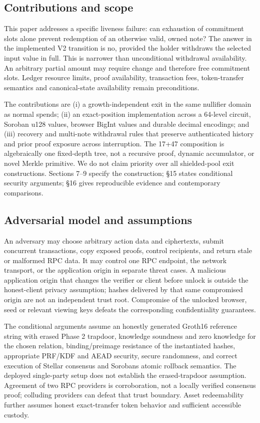 \documentclass[11pt,letterpaper]{article}
\begin{document}
\subsection{Contributions and scope}\label{contributions-and-scope}

This paper addresses a specific liveness failure: can exhaustion of
commitment slots alone prevent redemption of an otherwise valid, owned
note? The answer in the implemented V2 transition is no, provided the
holder withdraws the selected input value in full. This is narrower than
unconditional withdrawal availability. An arbitrary partial amount may
require change and therefore free commitment slots. Ledger resource
limits, proof availability, transaction fees, token-transfer semantics
and canonical-state availability remain preconditions.

The contributions are (i) a growth-independent exit in the same
nullifier domain as normal spends; (ii) an exact-position implementation
across a 64-level circuit, Soroban u128 values, browser BigInt values
and durable decimal encodings; and (iii) recovery and multi-note
withdrawal rules that preserve authenticated history and prior proof
exposure across interruption. The 17+47 composition is algebraically one
fixed-depth tree, not a recursive proof, dynamic accumulator, or novel
Merkle primitive. We do not claim priority over all shielded-pool exit
constructions. Sections 7--9 specify the construction; \S{}15 states
conditional security arguments; \S{}16 gives reproducible evidence and
contemporary comparisons.

\subsection{Adversarial model and
assumptions}\label{adversarial-model-and-assumptions}

An adversary may choose arbitrary action data and ciphertexts, submit
concurrent transactions, copy exposed proofs, control recipients, and
return stale or malformed RPC data. It may control one RPC endpoint, the
network transport, or the application origin in separate threat cases. A
malicious application origin that changes the verifier or client before
unlock is outside the honest-client privacy assumption; hashes delivered
by that same compromised origin are not an independent trust root.
Compromise of the unlocked browser, seed or relevant viewing keys
defeats the corresponding confidentiality guarantees.

The conditional arguments assume an honestly generated Groth16 reference
string with erased Phase 2 trapdoor, knowledge soundness and zero
knowledge for the chosen relation, binding/\allowbreak{}preimage
resistance of the instantiated hashes, appropriate PRF/\allowbreak{}KDF
and AEAD security, secure randomness, and correct execution of Stellar
consensus and Soroban\textquotesingle s atomic rollback semantics. The
deployed single-party setup does not establish the erased-trapdoor
assumption. Agreement of two RPC providers is corroboration, not a
locally verified consensus proof; colluding providers can defeat that
trust boundary. Asset redeemability further assumes honest
exact-transfer token behavior and sufficient accessible custody.
\end{document}

